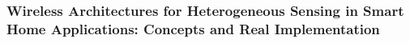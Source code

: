         \subsubsection*{Wireless Architectures for Heterogeneous Sensing in Smart Home Applications: Concepts and Real Implementation}

